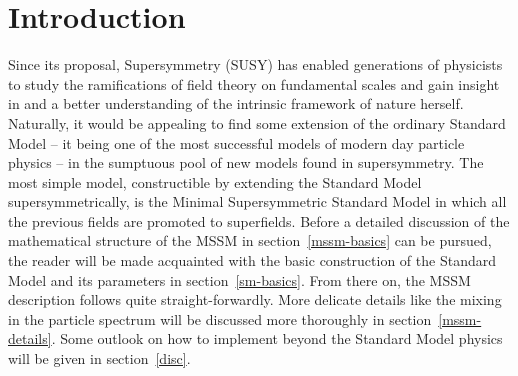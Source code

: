 
\section{Introduction}
Since its proposal, Supersymmetry (SUSY) has enabled generations of physicists to study the ramifications of field theory on fundamental scales and gain insight in and a better understanding of the intrinsic framework of nature herself. Naturally, it would be appealing to find some extension of the ordinary Standard Model – it being one of the most successful models of modern day particle physics – in the sumptuous pool of new models found in supersymmetry. The most simple model, constructible by extending the Standard Model supersymmetrically, is the Minimal Supersymmetric Standard Model in which all the previous fields are promoted to superfields. Before a detailed discussion of the mathematical structure of the MSSM in section~\ref{mssm-basics} can be pursued, the reader will be made acquainted with the basic construction of the Standard Model and its parameters in section~\ref{sm-basics}. From there on, the MSSM description follows quite straight-forwardly. More delicate details like the mixing in the particle spectrum will be discussed more thoroughly in section~\ref{mssm-details}. Some outlook on how to implement beyond the Standard Model physics will be given in section~\ref{disc}.